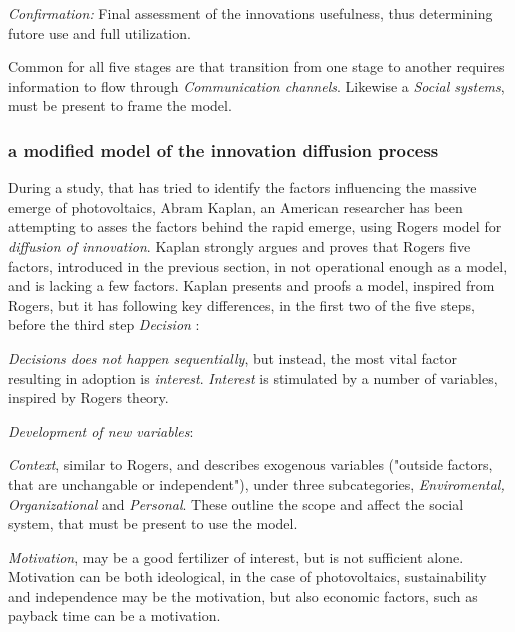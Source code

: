 \documentclass[journal]{IEEEtran}
\begin{document}
\textit{Confirmation:} Final assessment of the innovations usefulness, thus determining futore use and full utilization.   

Common for all five stages are that transition from one stage to another requires information to flow through \textit{Communication channels}. Likewise a \textit{Social systems}, must be present to frame the model.\newline


\subsubsection{a modified model of the innovation diffusion process}
During a study, that has tried to identify the factors influencing the massive emerge of photovoltaics, Abram Kaplan, an American researcher has been attempting to asses the factors behind the rapid emerge, using Rogers model for \textit{diffusion of innovation}.
Kaplan strongly argues and proves that Rogers five factors, introduced in the previous section, in not operational enough as a model, and is lacking a few factors. Kaplan presents and proofs a model, inspired from Rogers, but it has following key differences, in the first two of the five steps, before the third step \textit{Decision} \cite{passive_to_active}: \newline

\textit{Decisions does not happen sequentially}, but instead, the most vital factor resulting in adoption is \textit{interest}. \textit{Interest} is stimulated by a number of variables, inspired by Rogers theory. \newline

\textit{Development of new variables}: \newline

\textit{Context}, similar to Rogers, and describes exogenous variables ("outside factors, that are unchangable or independent"), under three subcategories, \textit{Enviromental, Organizational} and \textit{Personal}. These outline the scope and affect the social system, that must be present to use the model.\newline

\textit{Motivation}, may be a good fertilizer of interest, but is not sufficient alone. Motivation can be both ideological, in the case of photovoltaics, sustainability and independence may be the motivation, but also economic factors, such as payback time can be a motivation. \newline
\end{document}
